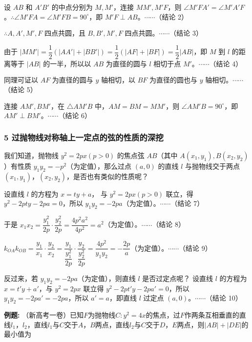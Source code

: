 \documentclass{article}
\begin{document}
\;\;\;\;\;\;设 $AB$ 和 $A'B'$ 的中点分别为 $M,M'$，连接 $MM',M'F$，则 $\angle M'FA' = \angle M'A'F$。$\therefore \angle M'FA = \angle M'FB = 90^\circ$，即 $M'F \perp AB$。$\cdots\cdots$（结论 2）

\;\;\;\;\;\;$\therefore A,A',M',F$ 四点共圆，且 $B,B',M',F$ 四点共圆。$\cdots\cdots$（结论 3）

\;\;\;\;\;\;由于 $|MM'| = \dfrac{1}{2}(|AA'| + |BB'|) = \dfrac{1}{2}(|AF| + |BF|) = \dfrac{1}{2}|AB|$，即 $M$ 到 $l$ 的距离等于 $|AB|$ 的一半，所以以 $AB$ 为直径的圆与 $l$ 相切于点 $M'$。$\cdots\cdots$（结论 4）

\;\;\;\;\;\;同理可证以 $AF$ 为直径的圆与 $y$ 轴相切，以 $BF$ 为直径的圆也与 $y$ 轴相切。$\cdots\cdots$（结论 5）

\;\;\;\;\;\;连接 $AM',BM'$，在 $\triangle AM'B$ 中，$AM = BM = MM'$，则 $\angle AM'B = 90^\circ$，即 $AM' \perp BM'$。$\cdots\cdots$（结论 6）

\subsubsection*{5 过抛物线对称轴上一定点的弦的性质的深挖}

\;\;\;\;\;\;我们知道，抛物线 $y^2 = 2px(p>0)$ 的焦点弦 $AB$（其中 $A(x_1,y_1),B(x_2,y_2)$）有性质 $y_1y_2 = -p^2$（为定值），那么过点 $(a,0)$ 的直线 $l$ 与抛物线交于两点 $(x_1,y_1)$，$(x_2,y_2)$，是否也有类似的性质呢？

\;\;\;\;\;\;设直线 $l$ 的方程为 $x = ty + a$，
与 $y^2 = 2px(p>0)$ 联立，得 $y^2 - 2pty - 2pa = 0$，所以 $y_1y_2 = -2pa$（为定值）。$\cdots\cdots$（结论 7）

\;\;\;\;\;\;于是 $x_1x_2 = \dfrac{y_1^2}{2p} \cdot \dfrac{y_2^2}{2p} = \dfrac{4p^2a^2}{4p^2} = a^2$（为定值）。$\cdots\cdots$（结论 8）

\;\;\;\;\;\;$k_{OA}k_{OB} = \dfrac{y_1}{x_1} \cdot \dfrac{y_2}{x_2} = \dfrac{y_1}{\dfrac{y_1^2}{2p}} \cdot \dfrac{y_2}{\dfrac{y_2^2}{2p}} = \dfrac{4p^2}{y_1y_2} = -\dfrac{2p}{a}$（为定值）。$\cdots\cdots$（结论 9）

\;\;\;\;\;\;反过来，若 $y_1y_2 = -2pa$（为定值），则直线 $l$ 是否过定点呢？
设直线 $l$ 的方程为 $x = t'y + a'$，与 $y^2 = 2px$ 联立得 $y^2 - 2pt'y - 2pa' = 0$，所以 $y_1y_2 = -2pa' = -2pa$，所以 $a' = a$，即直线 $l$ 过定点 $(a,0)$。$\cdots\cdots$（结论 10）
\vspace{3em}

\noindent
\textbf{例题: }（新高考一卷）已知$F$为抛物线$C:y^2 = 4x$的焦点，过$F$作两条互相垂直的直线$l_1$，$l_2$，直线$l_1$与$C$交于$A$，$B$两点，直线$l_2$与$C$交于$D$，$E$两点，则$|AB| + |DE|$的最小值为
\vspace{0.5em}
\end{document}
